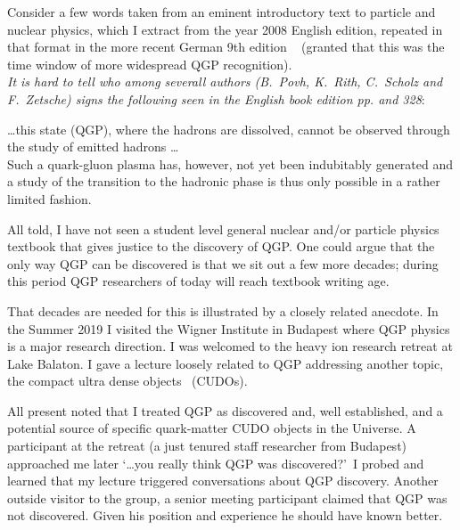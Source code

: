 Consider a few words taken from an eminent introductory text to particle and nuclear physics, which I extract from the year 2008 English edition, repeated in that format in the more recent German 9th edition ~\cite{Povh:1995mua} (granted that this was the time window of more widespread QGP recognition).\\

\noindent \textit{It is hard to tell who among severall authors (B.~Povh, K.~Rith, C.~Scholz and F.~Zetsche) signs the following seen in the English book edition pp. and 328}:\\[-0.7cm]
%
\begin{mdframed}[linecolor=gray,roundcorner=12pt,backgroundcolor=GreenYellow!15,linewidth=1pt,leftmargin=0cm,rightmargin=0cm,topline=true,bottomline=true,skipabove=12pt]\relax%
%
\ldots this state (QGP), where the hadrons are dissolved, cannot be observed through the study of emitted hadrons \ldots\\
Such a quark-gluon plasma has, however, not yet been indubitably generated and a study of the transition to the hadronic phase is thus only possible in a rather limited fashion. 
\end{mdframed}
\vskip 0.5cm
All told, I have not seen a student level general nuclear and/or particle physics textbook that gives justice to the discovery of QGP. One could argue that the only way QGP can be discovered is that we sit out a few more decades; during this period QGP researchers of today will reach textbook writing age. 

That decades are needed for this is illustrated by a closely related anecdote. In the Summer 2019 I visited the Wigner Institute in Budapest where QGP physics is a major research direction. I was welcomed to the heavy ion research retreat at Lake Balaton. I gave a lecture loosely related to QGP addressing another topic, the compact ultra dense objects~\cite{Labun:2011wn} (CUDOs). 

All present noted that I treated QGP as discovered and, well established, and a potential source of specific quark-matter CUDO objects in the Universe. A participant at the retreat (a just tenured staff researcher from Budapest) approached me later \lq \ldots you really think QGP was discovered?\rq\ I probed and learned that my lecture triggered conversations about QGP discovery. Another outside visitor to the group, a senior meeting participant claimed that QGP was not discovered.\label{HoHo} Given his position and experience he should have known better.

